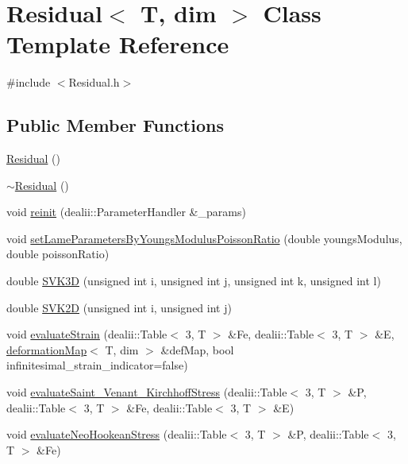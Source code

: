 \section{Residual$<$ T, dim $>$ Class Template Reference}
\label{class_residual}


{\ttfamily \#include $<$Residual.\+h$>$}

\subsection*{Public Member Functions}
\begin{DoxyCompactItemize}
\item 
\mbox{\hyperlink{class_residual_a4b540ba8e3ad0a1f8cfe2b4acd20493b}{Residual}} ()
\item 
\mbox{\hyperlink{class_residual_a8eef8c757003dd763b7dddc733f65641}{$\sim$\+Residual}} ()
\item 
void \mbox{\hyperlink{class_residual_a683e96e9d88d46820c0964786424fdf2}{reinit}} (dealii\+::\+Parameter\+Handler \&\+\_\+params)
\item 
void \mbox{\hyperlink{class_residual_a74a86942f009e483e946ac0a0036bd71}{set\+Lame\+Parameters\+By\+Youngs\+Modulus\+Poisson\+Ratio}} (double youngs\+Modulus, double poisson\+Ratio)
\item 
double \mbox{\hyperlink{class_residual_a10e7144d5c4746f15a48d506830790cb}{S\+V\+K3D}} (unsigned int i, unsigned int j, unsigned int k, unsigned int l)
\item 
double \mbox{\hyperlink{class_residual_abd1627afa72ac735e6907067e1d47bb6}{S\+V\+K2D}} (unsigned int i, unsigned int j)
\item 
void \mbox{\hyperlink{class_residual_a4b181b84ebad5e2adb629b4a542dc9c6}{evaluate\+Strain}} (dealii\+::\+Table$<$ 3, T $>$ \&Fe, dealii\+::\+Table$<$ 3, T $>$ \&E, \mbox{\hyperlink{structdeformation_map}{deformation\+Map}}$<$ T, dim $>$ \&def\+Map, bool infinitesimal\+\_\+strain\+\_\+indicator=false)
\item 
void \mbox{\hyperlink{class_residual_a4215ec5a6eabd7573e0caeee6fd194ad}{evaluate\+Saint\+\_\+\+Venant\+\_\+\+Kirchhoff\+Stress}} (dealii\+::\+Table$<$ 3, T $>$ \&P, dealii\+::\+Table$<$ 3, T $>$ \&Fe, dealii\+::\+Table$<$ 3, T $>$ \&E)
\item 
void \mbox{\hyperlink{class_residual_a0f9ff6a237d377803ce368b26ca39652}{evaluate\+Neo\+Hookean\+Stress}} (dealii\+::\+Table$<$ 3, T $>$ \&P, dealii\+::\+Table$<$ 3, T $>$ \&Fe)
\item 

\end{DoxyCompactItemize}
